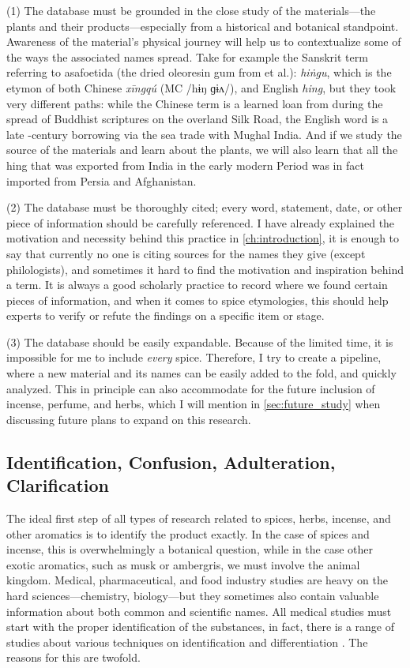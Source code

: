 (1) The database must be grounded in the close study of the materials---the plants and their products---especially from a historical and botanical standpoint. Awareness of the material's physical journey will help us to contextualize some of the ways the associated names spread. Take for example the Sanskrit term referring to asafoetida (the dried oleoresin gum from  et al.):  \textit{hiṅgu}, which is the etymon of both Chinese  \textit{xīngqú} (\gls{MC} /hɨŋ ɡɨʌ/),
and English \textit{hing}, but they took very different paths: while the Chinese term is a learned loan from during the spread of Buddhist scriptures on the overland Silk Road, the English word is a late -century borrowing via the sea trade with Mughal India. And if we study the source of the materials and learn about the plants, we will also learn that all the hing that was exported from India in the early modern Period was in fact imported from Persia and Afghanistan.

(2) The database must be thoroughly cited; every word, statement, date, or other piece of information should be carefully referenced. I have already explained the motivation and necessity behind this practice in \cref{ch:introduction}, it is enough to say that currently no one is citing sources for the names they give (except philologists), and sometimes it hard to find the motivation and inspiration behind a term. It is always a good scholarly practice to record where we found certain pieces of information, and when it comes to spice etymologies, this should help experts to verify or refute the findings on a specific item or stage.

(3) The database should be easily expandable. Because of the limited time, it is impossible for me to include \emph{every} spice. Therefore, I try to create a pipeline, where a new material and its names can be easily added to the fold, and quickly analyzed. This in principle can also accommodate for the future inclusion of incense, perfume, and herbs, which I will mention in \cref{sec:future_study} when discussing future plans to expand on this research.

\subsection{Identification, Confusion, Adulteration, Clarification}

The ideal first step of all types of research related to spices, herbs, incense, and other aromatics is to identify the product exactly. In the case of spices and incense, this is overwhelmingly a botanical question, while in the case other exotic aromatics, such as musk or ambergris, we must involve the animal kingdom. Medical, pharmaceutical, and food industry studies are heavy on the hard sciences---chemistry, biology---but they sometimes also contain valuable information about both common and scientific names. All medical studies must start with the proper identification of the substances, in fact, there is a range of studies about various techniques on identification and differentiation \autocite[cf.]{ford_cinnamon_2019}. The reasons for this are twofold. 

